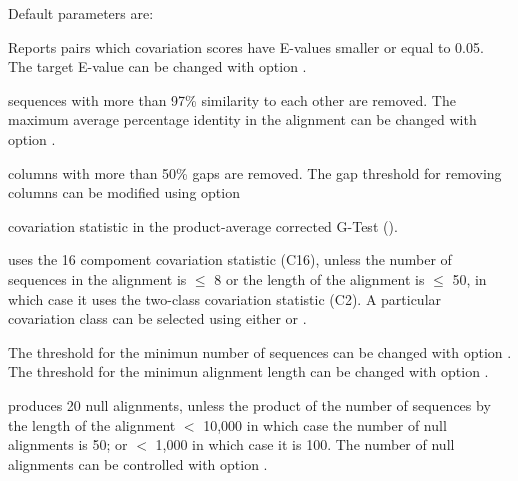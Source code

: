 Default parameters are:\\
\begin{sreitems}{}
\item[\emprog{Target E-value:}]Reports pairs which covariation
scores have E-values smaller or equal to 0.05. The target E-value can be changed
  with option .

\item[\emprog{Avg. percent identity:}]sequences with more than
  97\% similarity to each other are removed.  The maximum average
  percentage identity in the alignment can be changed with option
  .

\item[\emprog{Gaps in columns}]columns with more than 50\% gaps are
  removed. The gap threshold for removing columns can be modified
  using option 

\item[\emprog{Covariation statistic}]covariation statistic in the
  product-average corrected G-Test ().

\item[\emprog{Covariation Class}]uses the 16 compoment covariation
  statistic (C16), unless the number of sequences in the alignment is
  $\leq$ 8 or the length of the alignment is $\leq$ 50, in which case
  it uses the two-class covariation statistic (C2). A particular
  covariation class can be selected using either  or
  .

  The threshold for the minimun number of sequences can be changed
  with option .  The threshold for the minimun
  alignment length can be changed with option .

\item[\emprog{Null alignments:}]produces 20 null
  alignments, unless the product of the number of sequences by the
  length of the alignment $<$ 10,000 in which case the number of null
  alignments is 50; or $<$ 1,000 in which case it is 100. The
  number of null alignments can be controlled with option
  .
\end{sreitems}


